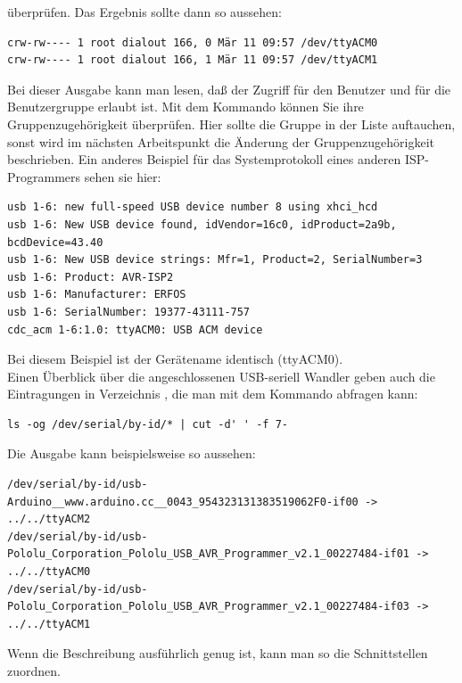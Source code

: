 überprüfen. Das Ergebnis sollte dann so aussehen:
\begin{footnotesize} \begin{verbatim}
crw-rw---- 1 root dialout 166, 0 Mär 11 09:57 /dev/ttyACM0
crw-rw---- 1 root dialout 166, 1 Mär 11 09:57 /dev/ttyACM1
\end{verbatim} \end{footnotesize}
Bei dieser Ausgabe kann man lesen, daß der Zugriff für den Benutzer 
und für die Benutzergruppe  erlaubt ist.
Mit dem Kommando  können Sie ihre Gruppenzugehörigkeit überprüfen.
Hier sollte die Gruppe  in der Liste auftauchen,
sonst wird im nächsten Arbeitspunkt die Änderung der Gruppenzugehörigkeit
beschrieben.
Ein anderes Beispiel für das Systemprotokoll eines anderen
ISP-Programmers  sehen sie hier:
\begin{footnotesize} \begin{verbatim}
usb 1-6: new full-speed USB device number 8 using xhci_hcd
usb 1-6: New USB device found, idVendor=16c0, idProduct=2a9b, bcdDevice=43.40
usb 1-6: New USB device strings: Mfr=1, Product=2, SerialNumber=3
usb 1-6: Product: AVR-ISP2
usb 1-6: Manufacturer: ERFOS
usb 1-6: SerialNumber: 19377-43111-757
cdc_acm 1-6:1.0: ttyACM0: USB ACM device
\end{verbatim} \end{footnotesize}

Bei diesem Beispiel ist der Gerätename identisch (ttyACM0).\\

Einen Überblick über die angeschlossenen USB-seriell Wandler geben auch
die Eintragungen in Verzeichnis ,
die man mit dem Kommando abfragen kann:
\begin{large} \vspace{-0.4em} \begin{verbatim}
ls -og /dev/serial/by-id/* | cut -d' ' -f 7-
\end{verbatim} \end{large}
Die Ausgabe kann beispielsweise so aussehen:
\begin{footnotesize} \begin{verbatim}
/dev/serial/by-id/usb-Arduino__www.arduino.cc__0043_954323131383519062F0-if00 -> ../../ttyACM2
/dev/serial/by-id/usb-Pololu_Corporation_Pololu_USB_AVR_Programmer_v2.1_00227484-if01 -> ../../ttyACM0
/dev/serial/by-id/usb-Pololu_Corporation_Pololu_USB_AVR_Programmer_v2.1_00227484-if03 -> ../../ttyACM1
\end{verbatim} \end{footnotesize}
Wenn die Beschreibung ausführlich genug ist, kann man so die Schnittstellen zuordnen.


